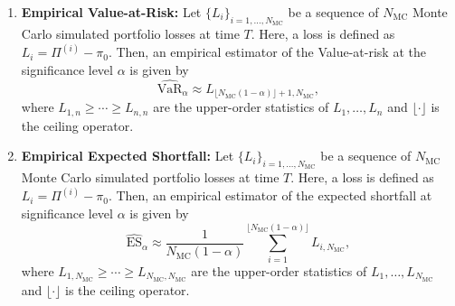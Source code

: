 \begin{enumerate}
    \begin{equation*}
        \text{Calmar Ratio} = \frac{R_\text{annual}}{\text{MDD}}.
    \end{equation*}
    \item \textbf{Empirical Value-at-Risk:} Let $\{L_i\}_{i = 1, \ldots, N_\text{MC}}$ be a sequence of $N_\text{MC}$ Monte Carlo simulated portfolio losses at time $T$. Here, a loss is defined as $L_i = \Pi^{(i)}-\pi_0$. Then, an empirical estimator of the Value-at-risk at the significance level $\alpha$ is given by 
    \begin{equation*}
        \widehat{\text{VaR}}_\alpha \approx L_{\lfloor N_\text{MC}(1-\alpha) \rfloor+1,N_\text{MC}},
    \end{equation*}
    where $L_{1,n} \geq \cdots \geq L_{n,n}$ are the upper-order statistics of $L_1, \ldots, L_n$ and $\lfloor \cdot \rfloor$ is the ceiling operator. 
    \item \textbf{Empirical Expected Shortfall:} Let $\{L_i\}_{i = 1, \ldots, N_\text{MC}}$ be a sequence of $N_\text{MC}$ Monte Carlo simulated portfolio losses at time $T$. Here, a loss is defined as $L_i = \Pi^{(i)}-\pi_0$. Then, an empirical estimator of the expected shortfall at significance level $\alpha$ is given by
    \begin{equation*}
        \widehat{\text{ES}}_\alpha \approx \frac{1}{N_\text{MC}(1-\alpha)} \sum_{i=1}^{\lfloor N_\text{MC}(1-\alpha) \rfloor} L_{i,N_\text{MC}},
    \end{equation*}
    where $L_{1,N_\text{MC}} \geq \cdots \geq L_{N_\text{MC},N_\text{MC}}$ are the upper-order statistics of $L_1, \ldots, L_{N_\text{MC}}$ and $\lfloor \cdot \rfloor$ is the ceiling operator. 
\end{enumerate}
